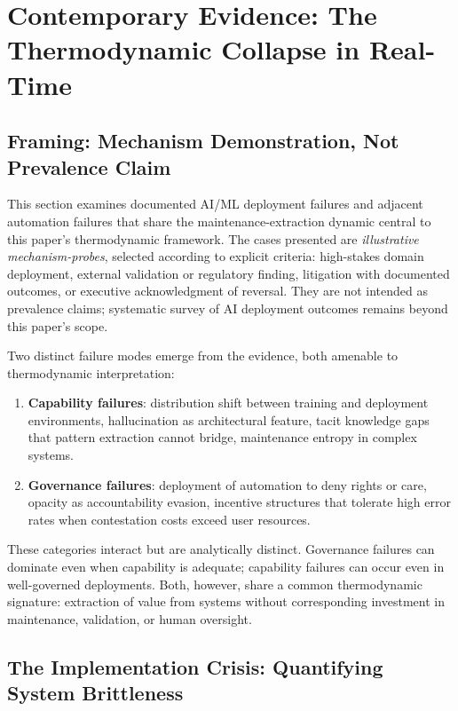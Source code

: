 \section{Contemporary Evidence: The Thermodynamic Collapse in Real-Time}
\label{sec:contemporary}

\subsection{Framing: Mechanism Demonstration, Not Prevalence Claim}

This section examines documented AI/ML deployment failures and adjacent automation failures that share the maintenance-extraction dynamic central to this paper's thermodynamic framework. The cases presented are \textit{illustrative mechanism-probes}, selected according to explicit criteria: high-stakes domain deployment, external validation or regulatory finding, litigation with documented outcomes, or executive acknowledgment of reversal. They are not intended as prevalence claims; systematic survey of AI deployment outcomes remains beyond this paper's scope.

Two distinct failure modes emerge from the evidence, both amenable to thermodynamic interpretation:

\begin{enumerate}
\item \textbf{Capability failures}: distribution shift between training and deployment environments, hallucination as architectural feature, tacit knowledge gaps that pattern extraction cannot bridge, maintenance entropy in complex systems.

\item \textbf{Governance failures}: deployment of automation to deny rights or care, opacity as accountability evasion, incentive structures that tolerate high error rates when contestation costs exceed user resources.
\end{enumerate}

These categories interact but are analytically distinct. Governance failures can dominate even when capability is adequate; capability failures can occur even in well-governed deployments. Both, however, share a common thermodynamic signature: extraction of value from systems without corresponding investment in maintenance, validation, or human oversight.

\subsection{The Implementation Crisis: Quantifying System Brittleness}

